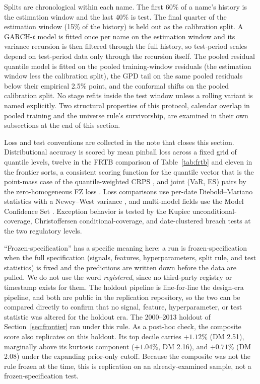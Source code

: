 \documentclass[11pt]{article}
\theoremstyle{remark}
\begin{document}
Splits are chronological within each name. The first 60\% of a name's
history is the estimation window and the last 40\% is test. The final
quarter of the estimation window (15\% of the history) is held out as
the calibration split. A GARCH-$t$ model is fitted once per name on
the estimation window and its variance recursion is then filtered
through the full history, so test-period scales depend on test-period
data only through the recursion itself. The pooled residual quantile
model is fitted on the pooled training-window residuals (the estimation window less the calibration split), the GPD tail on
the same pooled residuals below their empirical 2.5\% point, and the
conformal shifts on the pooled calibration split. No stage refits
inside the test window unless a rolling variant is named explicitly.
Two structural properties of this protocol, calendar overlap in
pooled training and the universe rule's survivorship, are examined in
their own subsections at the end of this section.

Loss and test conventions are collected in the note that closes this section. Distributional accuracy is scored by mean pinball loss across a fixed grid of quantile levels, twelve in the FRTB comparison of Table~\ref{tab:frtb} and eleven in the frontier sorts, a consistent scoring function for the quantile vector that is the point-mass case of the quantile-weighted CRPS \citep{gneitingranjan2011}, and joint (VaR, ES) pairs by the zero-homogeneous FZ loss \citep{fissler2016,patton2019}. Loss comparisons use per-date Diebold--Mariano statistics \citep{dieboldmariano1995} with a Newey--West variance \citep{neweywest1987}, and multi-model fields use the Model Confidence Set \citep{hansen2011mcs}. Exception behavior is tested by the Kupiec unconditional-coverage, Christoffersen conditional-coverage, and date-clustered breach tests at the two regulatory levels.

``Frozen-specification'' has a specific meaning here: a run is
frozen-specification when the full specification (signals, features,
hyperparameters, split rule, and test statistics) is fixed and the
predictions are written down before the data are pulled. We do not use
the word \emph{registered}, since no third-party registry or timestamp
exists for them. The holdout pipeline is line-for-line the
design-era pipeline, and both are public in the replication
repository, so the two can be compared directly to confirm that no signal,
feature, hyperparameter, or test statistic was altered for the holdout
era. The
2000--2013 holdout of Section~\ref{sec:frontier} ran under this rule. As
a post-hoc check, the composite score also replicates on this holdout.
Its top decile carries $+1.12\%$ (DM 2.51), marginally above its kurtosis
component ($+1.04\%$, DM 2.16), and $+0.71\%$ (DM 2.08) under the
expanding prior-only cutoff. Because the composite was not the rule frozen at the time, this is replication on an already-examined sample, not a frozen-specification test.
\end{document}
